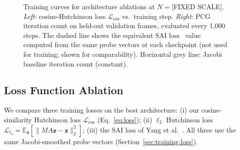 \documentclass[acmtog,anonymous,review]{acmart}
\begin{document}
\begin{figure}[h]
  \centering
  \caption{Training curves for architecture ablations at $N = $[FIXED SCALE].
    \emph{Left}: cosine-Hutchinson loss $\mathcal{L}_{\mathrm{cos}}$ vs.\ training step.
    \emph{Right}: PCG iteration count on held-out validation frames, evaluated every 1{,}000 steps.
    The dashed line shows the equivalent SAI loss~\cite{yang2025sparse} value computed from the
    same probe vectors at each checkpoint (not used for training; shown for comparability).
    Horizontal grey line: Jacobi baseline iteration count (constant).
  }
  \label{fig:training:ablation}
\end{figure}

\subsection{Loss Function Ablation}
\label{sec:ablation:loss}

We compare three training losses on the best architecture:
(i) our cosine-similarity Hutchinson loss $\mathcal{L}_{\mathrm{cos}}$ (Eq.~\ref{eq:loss});
(ii) $\ell_2$ Hutchinson loss $\mathcal{L}_{\ell_2} = \mathbb{E}_\mathbf{z}[\|MA\mathbf{z} -
\mathbf{z}\|_2^2]$;
(iii) the SAI loss of Yang et al.~\cite{yang2025sparse}.
All three use the same Jacobi-smoothed probe vectors (Section~\ref{sec:training:loss}).
\end{document}
